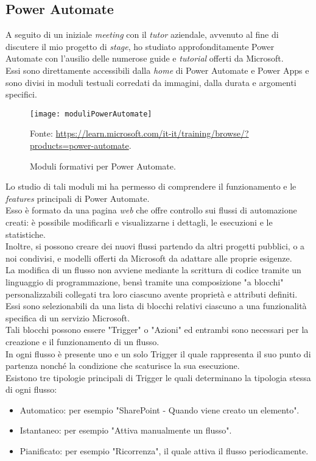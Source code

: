\subsection{Power Automate}
A seguito di un iniziale \emph{meeting} con il \emph{tutor} aziendale, avvenuto al fine di discutere il mio progetto di \emph{stage}, ho studiato approfonditamente Power Automate con l'ausilio delle numerose guide e \emph{tutorial} offerti da Microsoft.\\
Essi sono direttamente accessibili dalla \emph{home} di Power Automate e Power Apps e sono divisi in moduli testuali corredati da immagini, dalla durata e argomenti specifici. 

\begin{figure}[htbp] 
    \centering 
    \texttt{[image: moduliPowerAutomate]} 
    \caption{Moduli formativi per Power Automate.}
    \label{fig:moduliPowerAutomate}
    \vspace{1mm}
    Fonte: \url{https://learn.microsoft.com/it-it/training/browse/?products=power-automate}.
\end{figure}

\noindent Lo studio di tali moduli mi ha permesso di comprendere il funzionamento e le \emph{features} principali di Power Automate.\\
Esso è formato da una pagina \emph{web} che offre controllo sui flussi di automazione creati: è possibile modificarli e visualizzarne i dettagli, le esecuzioni e le statistiche.\\
Inoltre, si possono creare dei nuovi flussi partendo da altri progetti pubblici, o a noi condivisi, e modelli offerti da Microsoft da adattare alle proprie esigenze.\\
La modifica di un flusso non avviene mediante la scrittura di codice tramite un linguaggio di programmazione, bensì tramite una composizione "a blocchi" personalizzabili collegati tra loro ciascuno avente proprietà e attributi definiti.\\
Essi sono selezionabili da una lista di blocchi relativi ciascuno a una funzionalità specifica di un servizio Microsoft.\\
Tali blocchi possono essere "Trigger" o "Azioni" ed entrambi sono necessari per la creazione e il funzionamento di un flusso.\\
In ogni flusso è presente uno e un solo Trigger il quale rappresenta il suo punto di partenza nonché la condizione che scaturisce la sua esecuzione.\\
Esistono tre tipologie principali di Trigger le quali determinano la tipologia stessa di ogni flusso:
\begin{itemize}
    \item Automatico: per esempio "SharePoint - Quando viene creato un elemento". 
    \item Istantaneo: per esempio "Attiva manualmente un flusso".
    \item Pianificato: per esempio "Ricorrenza", il quale attiva il flusso periodicamente.\\
\end{itemize}

